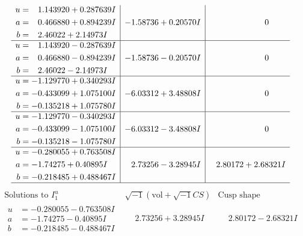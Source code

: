 \documentclass[1p]{elsarticle_modified}
\theoremstyle{definition}
\newcommand{\I}{\sqrt{-1}}
\begin{document}
$$\begin{array}{c|c|c}
\begin{aligned}
u &= \phantom{-}1.143920 + 0.287639 I \\
a &= \phantom{-}0.466880 + 0.894239 I \\
b &= \phantom{-}2.46022 + 2.14973 I\end{aligned}
 & -1.58736 + 0.20570 I & \phantom{-0.000000 } 0 \\ \hline\begin{aligned}
u &= \phantom{-}1.143920 - 0.287639 I \\
a &= \phantom{-}0.466880 - 0.894239 I \\
b &= \phantom{-}2.46022 - 2.14973 I\end{aligned}
 & -1.58736 - 0.20570 I & \phantom{-0.000000 } 0 \\ \hline\begin{aligned}
u &= -1.129770 + 0.340293 I \\
a &= -0.433099 + 1.075100 I \\
b &= -0.135218 + 1.075780 I\end{aligned}
 & -6.03312 + 3.48808 I & \phantom{-0.000000 } 0 \\ \hline\begin{aligned}
u &= -1.129770 - 0.340293 I \\
a &= -0.433099 - 1.075100 I \\
b &= -0.135218 - 1.075780 I\end{aligned}
 & -6.03312 - 3.48808 I & \phantom{-0.000000 } 0 \\ \hline\begin{aligned}
u &= -0.280055 + 0.763508 I \\
a &= -1.74275 + 0.40895 I \\
b &= -0.218485 + 0.488467 I\end{aligned}
 & \phantom{-}2.73256 - 3.28945 I & \phantom{-}2.80172 + 2.68321 I\\
 \hline 
 \end{array}$$\newpage$$\begin{array}{c|c|c}  
\text{Solutions to }I^u_{1}& \I (\text{vol} + \sqrt{-1}CS) & \text{Cusp shape}\\
 \hline 
\begin{aligned}
u &= -0.280055 - 0.763508 I \\
a &= -1.74275 - 0.40895 I \\
b &= -0.218485 - 0.488467 I\end{aligned}
 & \phantom{-}2.73256 + 3.28945 I & \phantom{-}2.80172 - 2.68321 I \\ \hline\begin{aligned}

\end{aligned}
\end{array}$$
\end{document}
